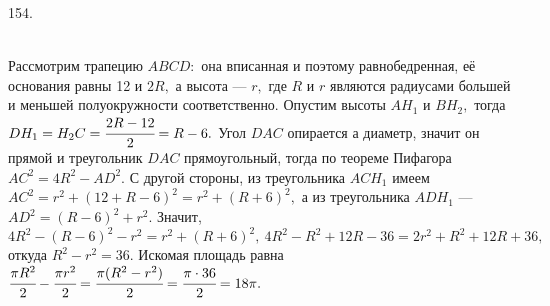 154. \begin{figure}[ht!]
\end{figure}\\
Рассмотрим трапецию $ABCD:$ она вписанная и поэтому равнобедренная, её основания равны 12 и $2R,$ а высота --- $r,$ где $R$ и $r$ являются радиусами большей и меньшей полуокружности соответственно. Опустим высоты $AH_1$ и $BH_2,$ тогда $DH_1=H_2C=\cfrac{2R-12}{2}=R-6.$ Угол $DAC$ опирается а диаметр, значит он прямой и треугольник $DAC$ прямоугольный, тогда по теореме Пифагора $AC^2=4R^2-AD^2.$ С другой стороны, из треугольника $ACH_1$ имеем $AC^2=r^2+(12+R-6)^2=r^2+(R+6)^2,$ а из треугольника $ADH_1$ --- $AD^2=(R-6)^2+r^2.$ Значит, $4R^2-(R-6)^2-r^2=r^2+(R+6)^2,\ 4R^2-R^2+12R-36=2r^2+R^2+12R+36,$ откуда $R^2-r^2=36.$ Искомая площадь равна $\cfrac{\pi R^2}{2}-\cfrac{\pi r^2}{2}=\cfrac{\pi(R^2-r^2)}{2}=\cfrac{\pi\cdot36}{2}=18\pi.$\newpage\noindent

